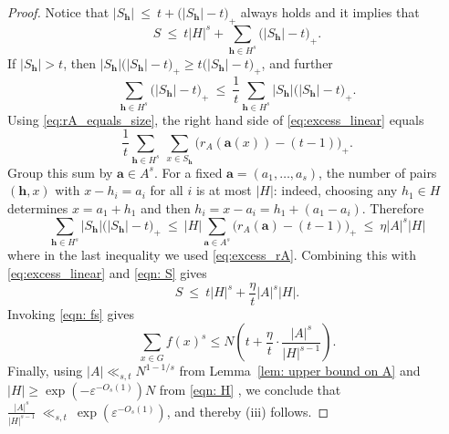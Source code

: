 \documentclass[10pt,a4paper]{amsart}
\begin{document}
\begin{proof}
Notice that $|S_{\mathbf{h}}|\ \le\ t+\bigl(|S_{\mathbf{h}}|-t\bigr)_+$ always holds and it implies that
\begin{equation}\label{eqn: S}
   S\ \le\ t|H|^s+\sum_{\mathbf{h}\in H^s}\bigl(|S_{\mathbf{h}}|-t\bigr)_+. 
\end{equation}
If $|S_{\mathbf{h}}|>t$, then $|S_{\mathbf{h}}|\bigl(|S_{\mathbf{h}}|-t\bigr)_+\ge
t\bigl(|S_{\mathbf{h}}|-t\bigr)_+$, and further
\begin{equation}\label{eq:excess_linear}
\sum_{\mathbf{h}\in H^s}\bigl(|S_{\mathbf{h}}|-t\bigr)_+
\ \le\ \frac1t\sum_{\mathbf{h}\in H^s}|S_{\mathbf{h}}|\bigl(|S_{\mathbf{h}}|-t\bigr)_+.
\end{equation}
Using \eqref{eq:rA_equals_size}, the right hand side of \eqref{eq:excess_linear} equals
\[
\frac1t\sum_{\mathbf{h}\in H^s}\ \sum_{x\in S_{\mathbf{h}}}\bigl(r_A(\mathbf{a}(x))-(t-1)\bigr)_+.
\]
Group this sum by $\mathbf{a}\in A^s$.  For a fixed $\mathbf{a}=(a_1,\dots,a_s)$, the number of pairs
$(\mathbf{h},x)$ with $x-h_i=a_i$ for all $i$ is at most $|H|$: indeed, choosing any $h_1\in H$ determines
$x=a_1+h_1$ and then $h_i=x-a_i=h_1+(a_1-a_i)$. Therefore
\[
\sum_{\mathbf{h}\in H^s}|S_{\mathbf{h}}|\bigl(|S_{\mathbf{h}}|-t\bigr)_+
\ \le\ |H|\sum_{\mathbf{a}\in A^s}\bigl(r_A(\mathbf{a})-(t-1)\bigr)_+
\ \le\ \eta |A|^s |H|
\]
where in the last inequality we used
\eqref{eq:excess_rA}.  Combining this with \eqref{eq:excess_linear} and \eqref{eqn: S} gives
\[
S\ \le\ t|H|^s+\frac{\eta}{t}|A|^s|H|.
\]
Invoking \eqref{eqn: fs} gives
\[
\sum_{x\in G} f(x)^s
\le
N\left(t+\frac{\eta}{t}\cdot\frac{|A|^s}{|H|^{s-1}}\right).
\]
Finally, using $|A|\ll_{s,t}N^{1-1/s}$ from Lemma~\ref{lem: upper bound on A} and
$|H|\ge \exp(-\varepsilon^{-O_s(1)})N$ from \eqref{eqn: H} , we conclude that
$
\frac{|A|^s}{|H|^{s-1}}
\ \ll_{s,t}\ \exp(\varepsilon^{-O_s(1)})$,
and thereby (iii) follows.
\end{proof}
\end{document}

